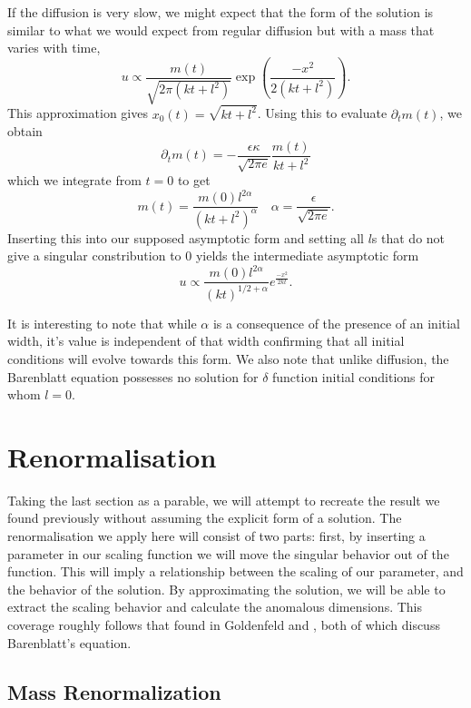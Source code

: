 If the diffusion is very slow, we might expect that the form of the solution is similar
to what we would expect from regular diffusion but with a mass that varies with time,
\[u \propto \frac{m(t)}{\sqrt{2\pi (kt + l^2)}} \exp\left(\frac{-x^2}{2(kt + l^2)}\right). \]
This approximation gives $x_0(t) = \sqrt{kt + l^2}$. Using this to evaluate $\partial_t m(t)$,
we obtain
\[\partial_t m(t) = -\frac{\epsilon \kappa}{\sqrt{2\pi e}} \frac{m(t)}{kt+l^2}\]
which we integrate from $t=0$ to get
\[m(t) = \frac{m(0) l^{2\alpha}}{(kt + l^2)^\alpha} \quad \alpha = \frac{\epsilon}{\sqrt{2\pi e}}.\]
Inserting this into our supposed asymptotic form and setting all $l$s that do not give a singular
constribution to 0 yields the intermediate asymptotic form
\[u \propto \frac{m(0)l^{2\alpha}}{ (kt)^{1/2 + \alpha}} e^\frac{-x^2}{2kt}.\]

It is interesting to note that while $\alpha$ is a consequence of the presence of an
initial width, it's value is independent of that width confirming that all initial
conditions will evolve towards this form.  We also note that unlike diffusion, the Barenblatt
equation possesses no solution for $\delta$ function initial conditions for whom $l=0$.

\section{Renormalisation}

Taking the last section as a parable, we will attempt to recreate the result we found
previously without assuming the explicit form of a solution.  The renormalisation we apply
here will consist of two parts: first, by inserting a parameter in our scaling 
function we will move the singular behavior out of the function.  This will imply a relationship
between the scaling of our parameter, and the behavior of the solution.  By approximating the
solution, we will be able to extract the scaling behavior and calculate the anomalous dimensions.
This coverage roughly follows that found in Goldenfeld \cite{Goldenfeld1992} and 
\cite{Goldenfeld1989}, both of which discuss Barenblatt's equation.

\subsection{Mass Renormalization}


